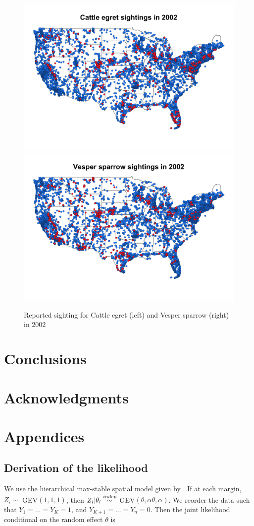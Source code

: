 \documentclass[11pt]{article}
\begin{document}
\begin{figure}
  \centering
  \includegraphics[width=0.47\linewidth]{plots/cattle_egret.png}
  \includegraphics[width=0.47\linewidth]{plots/vesper_sparrow.png}
  \caption{Reported sighting for Cattle egret (left) and Vesper sparrow (right) in 2002}
  \label{rbfig:data2002}
\end{figure}

\section{Conclusions}\label{rbs:con}

\section*{Acknowledgments}

\appendix
\section{Appendices}

\subsection{Derivation of the likelihood} \label{rba:likelihoodderivation}
We use the hierarchical max-stable spatial model given by \citet{Reich2012}. If at each margin, $Z_i \sim $ GEV$(1,1,1)$, then $Z_i | \theta_i \stackrel{indep}{\sim} $ GEV$(\theta, \alpha \theta, \alpha)$. We reorder the data such that $Y_1=\ldots=Y_K=1$, and $Y_{K+1} = \ldots = Y_n = 0$. Then the joint likelihood conditional on the random effect $\theta$ is
\end{document}
